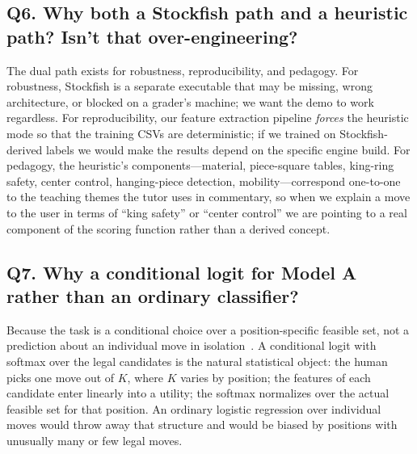 \documentclass[11pt]{article}
\begin{document}
\subsection*{Q6. Why both a Stockfish path and a heuristic path? Isn't that over-engineering?}
The dual path exists for robustness, reproducibility, and pedagogy. For robustness, Stockfish is a separate executable that may be missing, wrong architecture, or blocked on a grader's machine; we want the demo to work regardless. For reproducibility, our feature extraction pipeline \emph{forces} the heuristic mode so that the training CSVs are deterministic; if we trained on Stockfish-derived labels we would make the results depend on the specific engine build. For pedagogy, the heuristic's components---material, piece-square tables, king-ring safety, center control, hanging-piece detection, mobility---correspond one-to-one to the teaching themes the tutor uses in commentary, so when we explain a move to the user in terms of ``king safety'' or ``center control'' we are pointing to a real component of the scoring function rather than a derived concept.

\subsection*{Q7. Why a conditional logit for Model A rather than an ordinary classifier?}
Because the task is a conditional choice over a position-specific feasible set, not a prediction about an individual move in isolation~\cite{mcfadden1974conditional}. A conditional logit with softmax over the legal candidates is the natural statistical object: the human picks one move out of $K$, where $K$ varies by position; the features of each candidate enter linearly into a utility; the softmax normalizes over the actual feasible set for that position. An ordinary logistic regression over individual moves would throw away that structure and would be biased by positions with unusually many or few legal moves.
\end{document}
